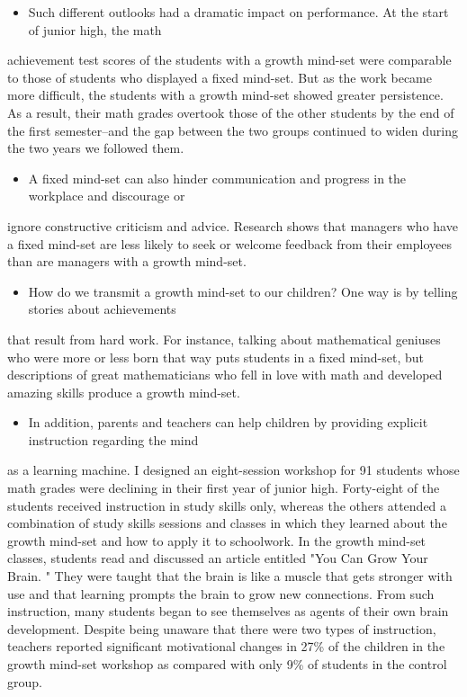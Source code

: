 \documentclass[UTF8,11pt]{ctexart}
\begin{document}
\begin{itemize}[leftmargin=2em,itemsep=.2em,topsep=.4em]\item[G.] Such different outlooks had a dramatic impact on performance. At the start of junior high, the math
\end{itemize}

achievement test scores of the students with a growth mind-set were comparable to those of students who displayed a fixed mind-set. But as the work became more difficult, the students with a growth mind-set showed greater persistence. As a result, their math grades overtook those of the other students by the end of the first semester--and the gap between the two groups continued to widen during the two years we followed them.


\begin{itemize}[leftmargin=2em,itemsep=.2em,topsep=.4em]\item[H.] A fixed mind-set can also hinder communication and progress in the workplace and discourage or
\end{itemize}

ignore constructive criticism and advice. Research shows that managers who have a fixed mind-set are less likely to seek or welcome feedback from their employees than are managers with a growth mind-set.


\begin{itemize}[leftmargin=2em,itemsep=.2em,topsep=.4em]\item[I.] How do we transmit a growth mind-set to our children? One way is by telling stories about achievements
\end{itemize}

that result from hard work. For instance, talking about mathematical geniuses who were more or less born that way puts students in a fixed mind-set, but descriptions of great mathematicians who fell in love with math and developed amazing skills produce a growth mind-set.


\begin{itemize}[leftmargin=2em,itemsep=.2em,topsep=.4em]\item[J.] In addition, parents and teachers can help children by providing explicit instruction regarding the mind
\end{itemize}

as a learning machine. I designed an eight-session workshop for 91 students whose math grades were declining in their first year of junior high. Forty-eight of the students received instruction in study skills only, whereas the others attended a combination of study skills sessions and classes in which they learned about the growth mind-set and how to apply it to schoolwork. In the growth mind-set classes, students read and discussed an article entitled "You Can Grow Your Brain. " They were taught that the brain is like a muscle that gets stronger with use and that learning prompts the brain to grow new connections. From such instruction, many students began to see themselves as agents of their own brain development. Despite being unaware that there were two types of instruction, teachers reported significant motivational changes in 27\% of the children in the growth mind-set workshop as compared with only 9\% of students in the control group.
\end{document}
